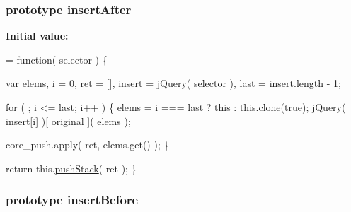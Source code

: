 \hypertarget{jquery-1_810_82-vsdoc_8js_a6337c8bc3e44ee2285abf58492aed7f2}{
\subsubsection[{insert\-After}]{ {\bf prototype} insert\-After}}\label{jquery-1_810_82-vsdoc_8js_a6337c8bc3e44ee2285abf58492aed7f2}
{\bfseries Initial value\-:}
\begin{DoxyCode}
= \textcolor{keyword}{function}( selector ) \{


        var elems,
            i = 0,
            ret = [],
            insert = \hyperlink{jquery-1_810_82-vsdoc_8js_add5237586d970a38a81f990e8eb28c6c}{jQuery}( selector ),
            \hyperlink{jquery-1_810_82-vsdoc_8js_a5a9684d230de11a6ec3029bcce128977}{last} = insert.length - 1;

        \textcolor{keywordflow}{for} ( ; i <= \hyperlink{jquery-1_810_82-vsdoc_8js_a5a9684d230de11a6ec3029bcce128977}{last}; i++ ) \{
            elems = i === \hyperlink{jquery-1_810_82-vsdoc_8js_a5a9684d230de11a6ec3029bcce128977}{last} ? \textcolor{keyword}{this} : this.\hyperlink{jquery-1_810_82-vsdoc_8js_a7d74ce76585989b4b6e2d506577e13ad}{clone}(\textcolor{keyword}{true});
            \hyperlink{jquery-1_810_82-vsdoc_8js_add5237586d970a38a81f990e8eb28c6c}{jQuery}( insert[i] )[ original ]( elems );

            
            core\_push.apply( ret, elems.get() );
        \}

        \textcolor{keywordflow}{return} this.\hyperlink{jquery-1_810_82-vsdoc_8js_afc3a7db1ef2b526338c06c07cecccd44}{pushStack}( ret );
    \}
\end{DoxyCode}
\hypertarget{jquery-1_810_82-vsdoc_8js_a5501f909e772d4b753879c11efe9b64f}{
\subsubsection[{insert\-Before}]{ {\bf prototype} insert\-Before}}\label{jquery-1_810_82-vsdoc_8js_a5501f909e772d4b753879c11efe9b64f}
